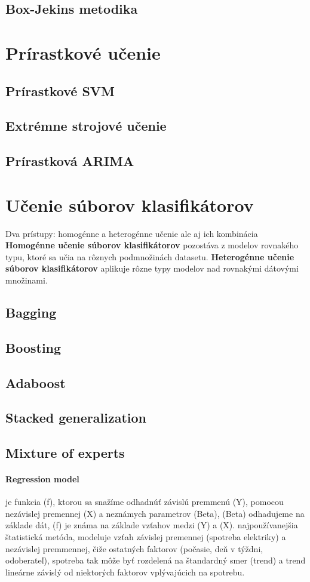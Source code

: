 \documentclass[12pt,oneside,slovak,a4paper]{book}
\begin{document}
\subsection{Box-Jekins metodika}

\section{Prírastkové učenie}
\subsection{Prírastkové SVM}
\subsection{Extrémne strojové učenie}
\subsection{Prírastková ARIMA}

\section{Učenie súborov klasifikátorov}
Dva prístupy: homogénne a heterogénne učenie ale aj ich kombinácia
\textbf{Homogénne učenie súborov klasifikátorov} pozostáva z modelov rovnakého
typu, ktoré sa učia na rôznych podmnožinách datasetu.
\textbf{Heterogénne učenie súborov klasifikátorov} aplikuje rôzne typy modelov
nad rovnakými dátovými množinami\cite{Grmanova2016}.
\subsection{Bagging}
\subsection{Boosting}
\subsection{Adaboost}
\subsection{Stacked generalization}
\subsection{Mixture of experts}

\paragraph{Regression model}
je funkcia (f), ktorou sa snažíme odhadnúť závislú premmenú (Y), pomocou
nezávislej premennej (X) a neznámych parametrov (Beta), (Beta) odhadujeme na
základe dát, (f) je známa na základe vzťahov medzi (Y) a (X)\cite{Grmanova2016}.
najpoužívanejšia štatistická metóda, modeluje vzťah závislej premennej
(spotreba elektriky) a nezávislej premmennej, čiže ostatných faktorov
(počasie, deň v týždni, odoberateľ), spotreba tak môže byť rozdelená na
štandardný smer (trend) a trend lineárne závislý od niektorých faktorov
vplývajúcich na spotrebu\cite{KumarSingh2013}.
\end{document}
